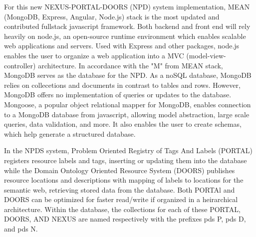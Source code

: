 \documentclass[10pt,twocolumn,twoside]{article}
\begin{document}
	For this new NEXUS-PORTAL-DOORS (NPD) system implementation, MEAN (MongoDB, Express, Angular, Node.js)  stack is the most updated and contributed fullstack javascript framework. Both backend and front end will rely heavily on node.js, an open-source runtime environment which enables scalable web applications and servers. Used with Express and other packages, node.js enables the user to organize a web application into a MVC (model-view-controller) architecture. In accordance with the "M" from MEAN stack, MongoDB serves as the database for the NPD. As a noSQL database, MongoDB relies on collecetions and documents in contrast to tables and rows. However, MongoDB offers no implementation of queries or updates to the database. Mongoose, a popular object relational mapper for MongoDB, enables connection to a MongoDB database from javascript, allowing model abstraction, large scale queries, data validation, and more. It also enables the user to create schemas, which help generate a structured database. \newline
	
	In the NPDS system, Problem Oriented Registry of Tags And Labels (PORTAL) registers resource labels and tags, inserting or updating them into the database while the Domain Ontology Oriented Resource System (DOORS) publishes resource locations and descriptions with mapping of labels to locations for the semantic web, retrieving stored data from the database. Both PORTAl and DOORS can be optimized for faster read/write if organized in a heirarchical architecture. Within the database, the collections for each of these PORTAL, DOORS, AND NEXUS are named respectively with the prefixes pds P, pds D, and pds N. \newline
\end{document}
